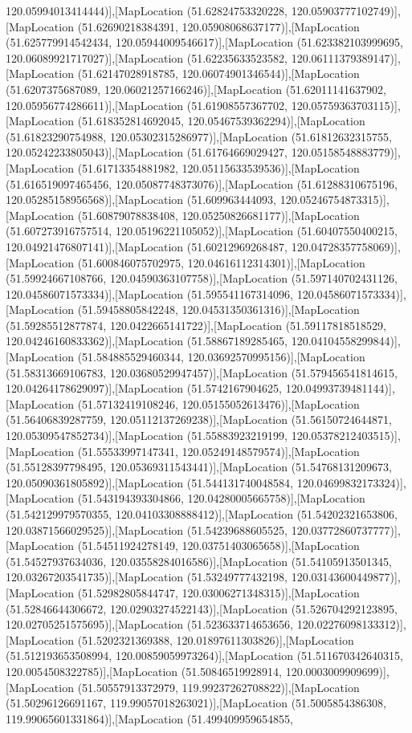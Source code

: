 120.05994013414444)],[MapLocation (51.62824753320228, 120.05903777102749)],[MapLocation (51.62690218384391, 120.05908068637177)],[MapLocation (51.625779914542434, 120.05944009546617)],[MapLocation (51.623382103999695, 120.06089921717027)],[MapLocation (51.62235633523582, 120.06111379389147)],[MapLocation (51.62147028918785, 120.06074901346544)],[MapLocation (51.6207375687089, 120.06021257166246)],[MapLocation (51.62011141637902, 120.05956774286611)],[MapLocation (51.61908557367702, 120.05759363703115)],[MapLocation (51.618352814692045, 120.05467539362294)],[MapLocation (51.61823290754988, 120.05302315286977)],[MapLocation (51.61812632315755, 120.05242233805043)],[MapLocation (51.61764669029427, 120.05158548883779)],[MapLocation (51.61713354881982, 120.05115633539536)],[MapLocation (51.616519097465456, 120.05087748373076)],[MapLocation (51.61288310675196, 120.05285158956568)],[MapLocation (51.609963444093, 120.05246754873315)],[MapLocation (51.60879078838408, 120.05250826681177)],[MapLocation (51.607273916757514, 120.05196221105052)],[MapLocation (51.60407550400215, 120.04921476807141)],[MapLocation (51.60212969268487, 120.04728357758069)],[MapLocation (51.600846075702975, 120.04616112314301)],[MapLocation (51.59924667108766, 120.04590363107758)],[MapLocation (51.597140702431126, 120.04586071573334)],[MapLocation (51.595541167314096, 120.04586071573334)],[MapLocation (51.59458805842248, 120.04531350361316)],[MapLocation (51.59285512877874, 120.0422665141722)],[MapLocation (51.59117818518529, 120.04246160833362)],[MapLocation (51.58867189285465, 120.04104558299844)],[MapLocation (51.584885529460344, 120.03692570995156)],[MapLocation (51.58313669106783, 120.03680529947457)],[MapLocation (51.579456541814615, 120.04264178629097)],[MapLocation (51.5742167904625, 120.04993739481144)],[MapLocation (51.57132419108246, 120.05155052613476)],[MapLocation (51.56406839287759, 120.05112137269238)],[MapLocation (51.56150724644871, 120.05309547852734)],[MapLocation (51.55883923219199, 120.05378212403515)],[MapLocation (51.55533997147341, 120.05249148579574)],[MapLocation (51.55128397798495, 120.05369311543441)],[MapLocation (51.54768131209673, 120.05090361805892)],[MapLocation (51.544131740048584, 120.04699832173324)],[MapLocation (51.543194393304866, 120.04280005665758)],[MapLocation (51.542129979570355, 120.04103308888412)],[MapLocation (51.54202321653806, 120.03871566029525)],[MapLocation (51.54239688605525, 120.03772860737777)],[MapLocation (51.54511924278149, 120.03751403065658)],[MapLocation (51.54527937634036, 120.03558284016586)],[MapLocation (51.54105913501345, 120.03267203541735)],[MapLocation (51.53249777432198, 120.03143600449877)],[MapLocation (51.52982805844747, 120.03006271348315)],[MapLocation (51.52846644306672, 120.02903274522143)],[MapLocation (51.526704292123895, 120.02705251575695)],[MapLocation (51.523633714653656, 120.02276098133312)],[MapLocation (51.5202321369388, 120.01897611303826)],[MapLocation (51.512193653508994, 120.00859059973264)],[MapLocation (51.511670342640315, 120.0054508322785)],[MapLocation (51.50846519928914, 120.0003009909699)],[MapLocation (51.50557913372979, 119.99237262708822)],[MapLocation (51.50296126691167, 119.99057018263021)],[MapLocation (51.5005854386308, 119.99065601331864)],[MapLocation (51.499409959654855, 